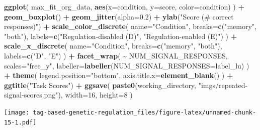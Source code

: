 \documentclass[
]{book}
\newenvironment{Shaded}{\begin{snugshade}}{\end{snugshade}}
\newcommand{\DataTypeTok}[1]{\textcolor[rgb]{0.13,0.29,0.53}{#1}}
\newcommand{\DecValTok}[1]{\textcolor[rgb]{0.00,0.00,0.81}{#1}}
\newcommand{\FloatTok}[1]{\textcolor[rgb]{0.00,0.00,0.81}{#1}}
\newcommand{\KeywordTok}[1]{\textcolor[rgb]{0.13,0.29,0.53}{\textbf{#1}}}
\newcommand{\NormalTok}[1]{#1}
\newcommand{\OperatorTok}[1]{\textcolor[rgb]{0.81,0.36,0.00}{\textbf{#1}}}
\newcommand{\StringTok}[1]{\textcolor[rgb]{0.31,0.60,0.02}{#1}}
\begin{document}
\begin{Shaded}
\begin{Highlighting}[]
\KeywordTok{ggplot}\NormalTok{( max\_fit\_org\_data, }\KeywordTok{aes}\NormalTok{(}\DataTypeTok{x=}\NormalTok{condition, }\DataTypeTok{y=}\NormalTok{score, }\DataTypeTok{color=}\NormalTok{condition) ) }\OperatorTok{+}
\StringTok{  }\KeywordTok{geom\_boxplot}\NormalTok{() }\OperatorTok{+}
\StringTok{  }\KeywordTok{geom\_jitter}\NormalTok{(}\DataTypeTok{alpha=}\FloatTok{0.2}\NormalTok{) }\OperatorTok{+}
\StringTok{  }\KeywordTok{ylab}\NormalTok{(}\StringTok{"Score (\# correct responses)"}\NormalTok{) }\OperatorTok{+}
\StringTok{  }\KeywordTok{scale\_color\_discrete}\NormalTok{(}
    \DataTypeTok{name=}\StringTok{"Condition"}\NormalTok{,}
    \DataTypeTok{breaks=}\KeywordTok{c}\NormalTok{(}\StringTok{"memory"}\NormalTok{, }\StringTok{"both"}\NormalTok{),}
    \DataTypeTok{labels=}\KeywordTok{c}\NormalTok{(}\StringTok{"Regulation{-}disabled (D)"}\NormalTok{, }\StringTok{"Regulation{-}enabled (E)"}\NormalTok{)}
\NormalTok{  ) }\OperatorTok{+}
\StringTok{  }\KeywordTok{scale\_x\_discrete}\NormalTok{(}
    \DataTypeTok{name=}\StringTok{"Condition"}\NormalTok{,}
    \DataTypeTok{breaks=}\KeywordTok{c}\NormalTok{(}\StringTok{"memory"}\NormalTok{, }\StringTok{"both"}\NormalTok{),}
    \DataTypeTok{labels=}\KeywordTok{c}\NormalTok{(}\StringTok{"D"}\NormalTok{, }\StringTok{"E"}\NormalTok{)}
\NormalTok{  ) }\OperatorTok{+}
\StringTok{  }\KeywordTok{facet\_wrap}\NormalTok{(}
    \OperatorTok{\textasciitilde{}}\StringTok{ }\NormalTok{NUM\_SIGNAL\_RESPONSES,}
    \DataTypeTok{scales=}\StringTok{"free\_y"}\NormalTok{,}
    \DataTypeTok{labeller=}\KeywordTok{labeller}\NormalTok{(}\DataTypeTok{NUM\_SIGNAL\_RESPONSES=}\NormalTok{label\_lu)}
\NormalTok{  ) }\OperatorTok{+}
\StringTok{  }\KeywordTok{theme}\NormalTok{(}
    \DataTypeTok{legend.position=}\StringTok{"bottom"}\NormalTok{,}
    \DataTypeTok{axis.title.x=}\KeywordTok{element\_blank}\NormalTok{()}
\NormalTok{  ) }\OperatorTok{+}
\StringTok{  }\KeywordTok{ggtitle}\NormalTok{(}\StringTok{"Task Scores"}\NormalTok{) }\OperatorTok{+}
\StringTok{  }\KeywordTok{ggsave}\NormalTok{(}
    \KeywordTok{paste0}\NormalTok{(working\_directory, }\StringTok{"imgs/repeated{-}signal{-}scores.png"}\NormalTok{),}
    \DataTypeTok{width=}\DecValTok{16}\NormalTok{,}
    \DataTypeTok{height=}\DecValTok{8}
\NormalTok{  )}
\end{Highlighting}
\end{Shaded}

\texttt{[image: tag-based-genetic-regulation\_files/figure-latex/unnamed-chunk-15-1.pdf]}
\end{document}
